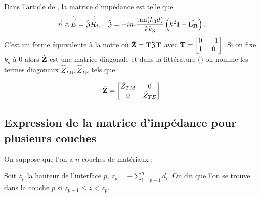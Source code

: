         Dans l'article de \cite{marceaux_high-order_2000}, la matrice d'impédance est telle que
        \begin{align*}
             \vn \pvect \hat{\vE} = \hat{\mathfrak{Z}} \hat{\vH_t}, && \hat{\mathfrak{Z}} = -i\eta_r\frac{\tan(k_3d)}{kk_3}\left(k^2\mI - \hat{\mLR}\right).
        \end{align*}
        C'est un forme équivalente à la notre où \(\hat{\mZ} = \mT\hat{\mathfrak{Z}}\mT\) avec \(\mT = \begin{bmatrix}0&-1\\1&0\end{bmatrix}\).
        Si on fixe \(k_y\) à \(0\) alors \(\hat \mZ\) est une matrice diagonale et dans la littérature (\cite{stupfel_implementation_2015,aubakirov_electromagnetic_2014,hoppe_impedance_1995}) on nomme les termes diagonaux \(\hat Z_{TM}, \hat Z_{TE}\) tels que
        
        \begin{equation*}
            \hat \mZ =
            \begin{bmatrix}
                \hat Z_{TM} & 0
                \\
                0 & \hat Z_{TE}
            \end{bmatrix}
        \end{equation*}

  \subsection{Expression de la matrice d'impédance pour plusieurs couches}
    On suppose que l'on a \(n\) couches de matériaux :
    \begin{figure}[h!btp]
        \centering
        \begin{tikzpicture}
            
        \end{tikzpicture}
    \end{figure}

    Soit \(z_p\) la hauteur de l'interface \(p\), \(z_p = -\sum_{i=p+1}^{n} d_{i}\). On dit que l'on se trouve dans la couche \(p\) si \(z_{p-1} \le z < z_p \).

